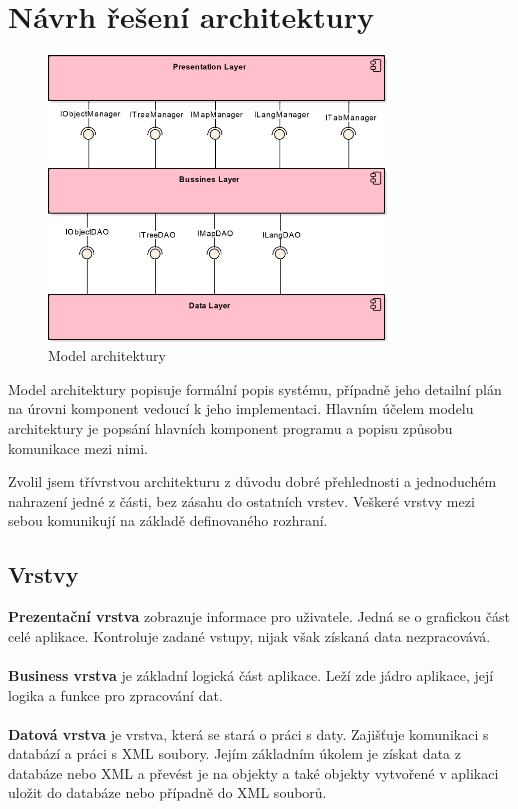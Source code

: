 \documentclass[thesis=B,czech]{resources/FITthesis}[2012/06/26]
\begin{document}
	\section{Návrh řešení architektury}
\begin{figure}\centering
	\includegraphics[width=0.8\textwidth]{images/architektura}
	\caption[Model architektury]{Model architektury}\label{fig:architektura}
\end{figure}
Model architektury popisuje formální popis systému, případně jeho detailní plán na úrovni komponent vedoucí k jeho implementaci. Hlavním účelem modelu architektury je popsání hlavních komponent programu a popisu způsobu komunikace mezi nimi.\par

Zvolil jsem třívrstvou architekturu z důvodu dobré přehlednosti a jednoduchém nahrazení jedné z části, bez zásahu do ostatních vrstev. Veškeré vrstvy mezi sebou komunikují na základě definovaného rozhraní.\\
\subsection{Vrstvy}
\textbf{Prezentační vrstva} zobrazuje informace pro uživatele. Jedná se o grafickou část celé aplikace. Kontroluje zadané vstupy, nijak však získaná data nezpracovává.\\
\\
\textbf{Business vrstva} je základní logická část aplikace. Leží zde jádro aplikace, její logika a funkce pro zpracování dat.\\
\\
\textbf{Datová vrstva} je vrstva, která se stará o práci s daty. Zajišťuje komunikaci s databází a práci s XML soubory. Jejím základním úkolem je získat data z databáze nebo XML a převést je na objekty a také objekty vytvořené v aplikaci uložit do databáze nebo případně do XML souborů. \\
\end{document}
